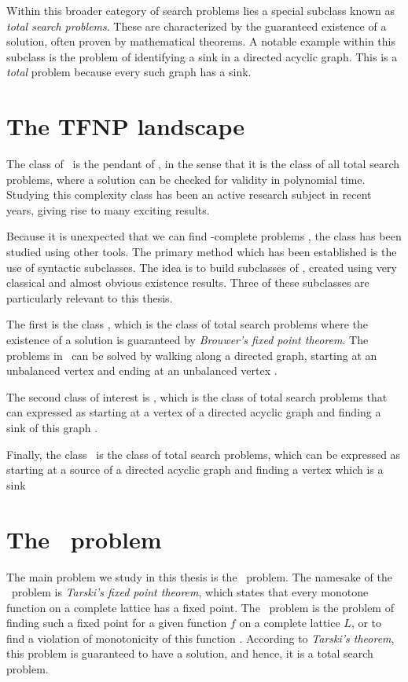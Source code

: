 Within this broader category of search problems lies a special subclass known as \emph{total search problems}. These are characterized by the guaranteed existence of a solution, often proven by mathematical theorems. A notable example within this subclass is the problem of identifying a sink in a directed acyclic graph. This is a \textit{total} problem because every such graph has a sink.

\section{The TFNP landscape}

The class of \TFNP\ is the pendant of \NP, in the sense that it is the class of all total search problems, where a solution can be checked for validity in polynomial time. Studying this complexity class has been an active research subject in recent years, giving rise to many exciting results.

Because it is unexpected that we can find \TFNP-complete problems , the class has been studied using other tools. The primary method which has been established is the use of syntactic subclasses. The idea is to build subclasses of \TFNP, created using very classical and almost obvious existence results. Three of these subclasses are particularly relevant to this thesis.

The first is the class \PPAD, which is the class of total search problems where the existence of a solution is guaranteed by \textit{Brouwer's fixed point theorem}. The problems in \PPAD\ can be solved by walking along a directed graph, starting at an unbalanced vertex and ending at an unbalanced vertex .

The second class of interest is \PLS, which is the class of total search problems that can expressed as starting at a vertex of a directed acyclic graph and finding a sink of this graph .

Finally, the class \EOPL\ is the class of total search problems, which can be expressed as starting at a source of a directed acyclic graph and finding a vertex which is a sink 

\section{The \Tarski\ problem}

The main problem we study in this thesis is the \Tarski\ problem. The namesake of the \Tarski\ problem is \textit{Tarski's fixed point theorem}, which states that every monotone function on a complete lattice has a fixed point. The \Tarski\ problem is the problem of finding such a fixed point for a given function $f$ on a complete lattice $L$, or to find a violation of monotonicity of this function . According to \textit{Tarski's theorem}, this problem is guaranteed to have a solution, and hence, it is a total search problem.

